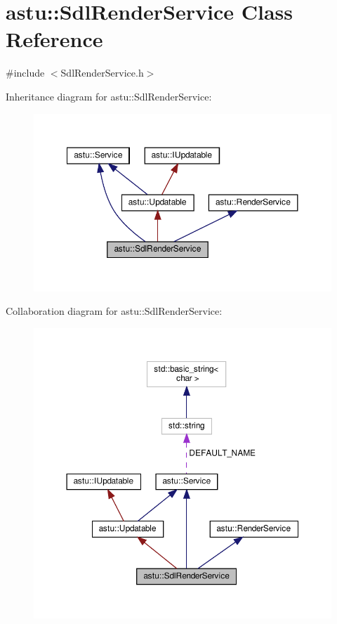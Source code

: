 \hypertarget{classastu_1_1SdlRenderService}{}\section{astu\+:\+:Sdl\+Render\+Service Class Reference}
\label{classastu_1_1SdlRenderService}


{\ttfamily \#include $<$Sdl\+Render\+Service.\+h$>$}



Inheritance diagram for astu\+:\+:Sdl\+Render\+Service\+:\nopagebreak
\begin{figure}[H]
\begin{center}
\leavevmode
\includegraphics[width=350pt]{classastu_1_1SdlRenderService__inherit__graph}
\end{center}
\end{figure}


Collaboration diagram for astu\+:\+:Sdl\+Render\+Service\+:\nopagebreak
\begin{figure}[H]
\begin{center}
\leavevmode
\includegraphics[width=350pt]{classastu_1_1SdlRenderService__coll__graph}
\end{center}
\end{figure}
